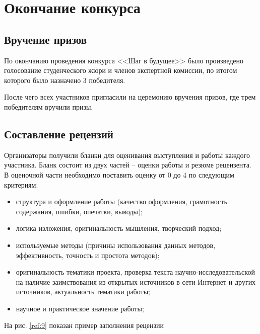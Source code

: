 \documentclass[12pt]{report}
\begin{document}
\chapter{Окончание конкурса}

\section{Вручение призов}

По окончанию проведения конкурса <<Шаг в будущее>>
было произведено голосование студенческого жюри и членов экспертной комиссии, 
по итогом которого было назначено 3 победителя. 

После чего всех участников пригласили на церемонию вручения призов, где трем победителям вручили призы.

\section{Составление рецензий}

Организаторы получили бланки для оценивания выступления и работы каждого участника.
Бланк состоит из двух частей -- оценки работы и резюме рецензента. 
В оценочной части необходимо поставить оценку от 0 до 4 по следующим критериям:

\begin{itemize}
	\item структура и оформление работы (качество оформления, грамотность содержания, ошибки, опечатки, выводы);
	\item логика изложения, оригинальность мышления, творческий подход;
	\item используемые методы (причины использования данных методов, эффективность, точность и простота методов);
	\item оригинальность тематики проекта, проверка текста научно-исследовательской на наличие заимствования из открытых
	источников в сети Интернет и других источников, актуальность тематики работы;
	\item научное и практическое значение работы;
\end{itemize}

На рис. \ref{ref:9} показан пример заполнения рецензии
\end{document}
